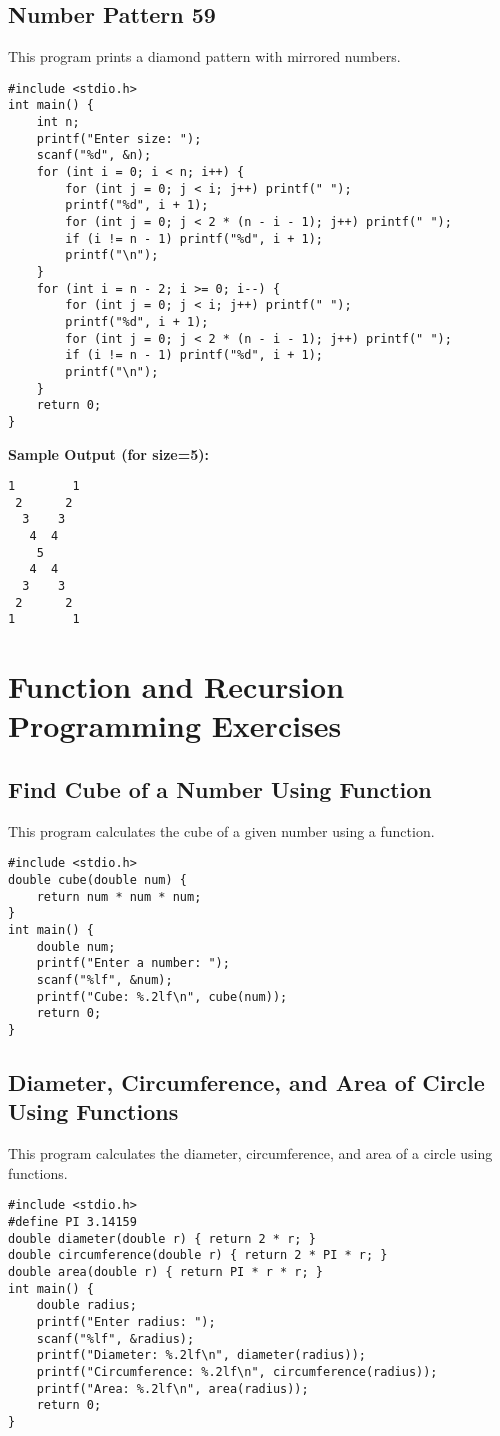 \documentclass[a4paper,12pt]{article}
\begin{document}
\subsection{Number Pattern 59}
This program prints a diamond pattern with mirrored numbers.
\begin{lstlisting}[caption={Number Pattern 59}]
#include <stdio.h>
int main() {
    int n;
    printf("Enter size: ");
    scanf("%d", &n);
    for (int i = 0; i < n; i++) {
        for (int j = 0; j < i; j++) printf(" ");
        printf("%d", i + 1);
        for (int j = 0; j < 2 * (n - i - 1); j++) printf(" ");
        if (i != n - 1) printf("%d", i + 1);
        printf("\n");
    }
    for (int i = n - 2; i >= 0; i--) {
        for (int j = 0; j < i; j++) printf(" ");
        printf("%d", i + 1);
        for (int j = 0; j < 2 * (n - i - 1); j++) printf(" ");
        if (i != n - 1) printf("%d", i + 1);
        printf("\n");
    }
    return 0;
}
\end{lstlisting}
\textbf{Sample Output (for size=5):}
\begin{verbatim}
1        1
 2      2
  3    3
   4  4
    5
   4  4
  3    3
 2      2
1        1
\end{verbatim}
\clearpage

\section{Function and Recursion Programming Exercises}

\subsection{Find Cube of a Number Using Function}
This program calculates the cube of a given number using a function.
\begin{lstlisting}[caption={Find Cube of a Number Using Function}]
#include <stdio.h>
double cube(double num) {
    return num * num * num;
}
int main() {
    double num;
    printf("Enter a number: ");
    scanf("%lf", &num);
    printf("Cube: %.2lf\n", cube(num));
    return 0;
}
\end{lstlisting}
\clearpage

\subsection{Diameter, Circumference, and Area of Circle Using Functions}
This program calculates the diameter, circumference, and area of a circle using functions.
\begin{lstlisting}[caption={Diameter, Circumference, and Area of Circle Using Functions}]
#include <stdio.h>
#define PI 3.14159
double diameter(double r) { return 2 * r; }
double circumference(double r) { return 2 * PI * r; }
double area(double r) { return PI * r * r; }
int main() {
    double radius;
    printf("Enter radius: ");
    scanf("%lf", &radius);
    printf("Diameter: %.2lf\n", diameter(radius));
    printf("Circumference: %.2lf\n", circumference(radius));
    printf("Area: %.2lf\n", area(radius));
    return 0;
}
\end{lstlisting}
\clearpage
\end{document}
